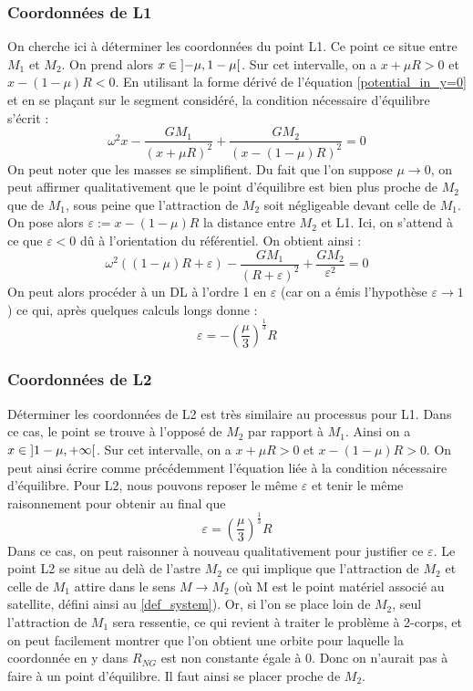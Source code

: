\documentclass[12pt]{article}
\theoremstyle{definition}
\theoremstyle{definition}
\begin{document}
	
	\subsubsection{Coordonnées de L1}
	On cherche ici à déterminer les coordonnées du point L1. Ce point ce situe entre $M_1$ et $M_2$. On prend alors $x \in \interval[open]{-\mu}{1-\mu}$. Sur cet intervalle, on a $x+\mu R>0$ et $x-(1-\mu)R<0$. En utilisant la forme dérivé de l'équation \ref{potential_in_y=0} et en se plaçant sur le segment considéré, la condition nécessaire d'équilibre s'écrit :
	\begin{equation}
		\label{L1_equilibrium_eq}
		\omega^2x - \frac{GM_1}{(x+\mu R)^2} + \frac{GM_2}{(x-(1-\mu)R)^2} = 0
	\end{equation}
	On peut noter que les masses se simplifient.
	Du fait que l'on suppose $\mu \to 0$, on peut affirmer qualitativement que le point d'équilibre est bien plus proche de $M_2$ que de $M_1$, sous peine que l'attraction de $M_2$ soit négligeable devant celle de $M_1$. On pose alors $\varepsilon := x - (1-\mu)R$ la distance entre $M_2$ et L1. Ici, on s'attend à ce que $\varepsilon < 0$ dû à l'orientation du référentiel. On obtient ainsi :
	\begin{equation}
		\omega^2((1-\mu)R+\varepsilon) - \frac{GM_1}{(R+\varepsilon)^2} + \frac{GM_2}{\varepsilon^2} = 0
	\end{equation}
	On peut alors procéder à un DL à l'ordre 1 en $\varepsilon$ (car on a émis l'hypothèse $\varepsilon \to 1$) ce qui, après quelques calculs longs donne :
	\begin{equation}
		\varepsilon = -(\frac{\mu}{3})^\frac{1}{3}R
	\end{equation}
	
	
	\subsubsection{Coordonnées de L2}
	Déterminer les coordonnées de L2 est très similaire au processus pour L1. Dans ce cas, le point se trouve à l'opposé de $M_2$ par rapport à $M_1$. Ainsi on a $x \in \interval[open]{1-\mu}{+\infty}$. Sur cet intervalle, on a $x+\mu R>0$ et $x-(1-\mu)R>0$. On peut ainsi écrire comme précédemment l'équation liée à la condition nécessaire d'équilibre. Pour L2, nous pouvons reposer le même $\varepsilon$ et tenir le même raisonnement pour obtenir au final que
	\begin{equation}
		\varepsilon = (\frac{\mu}{3})^\frac{1}{3}R
	\end{equation}
	Dans ce cas, on peut raisonner à nouveau qualitativement pour justifier ce $\varepsilon$. Le point L2 se situe au delà de l'astre $M_2$ ce qui implique que l'attraction de $M_2$ et celle de $M_1$ attire dans le sens $M \to M_2$ (où M est le point matériel associé au satellite, défini ainsi au \ref{def_system}). Or, si l'on se place loin de $M_2$, seul l'attraction de $M_1$ sera ressentie, ce qui revient à traiter le problème à 2-corps, et on peut facilement montrer que l'on obtient une orbite pour laquelle la coordonnée en y dans $R_{NG}$ est non constante égale à 0. Donc on n'aurait pas à faire à un point d'équilibre. Il faut ainsi se placer proche de $M_2$.
	
\end{document}
